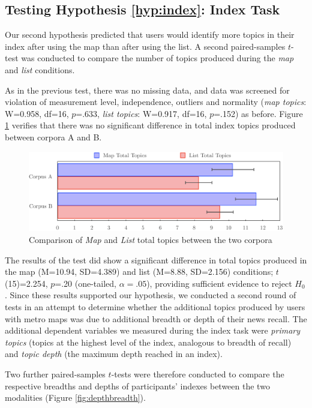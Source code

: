\subsection{Testing Hypothesis \ref{hyp:index}: Index Task}

Our second hypothesis predicted that users would identify more topics in their index after using the map than after using the list. A second paired-samples $t$-test was conducted to compare the number of topics produced during the \textit{map} and \textit{list} conditions.

As in the previous test, there was no missing data, and data was screened for violation of measurement level, independence, outliers and normality (\textit{map topics}: W=0.958, df=16, $p$=.633,  \textit{list topics}: W=0.917, df=16, $p$=.152) as before. Figure \ref{fig:index} verifies that there was no significant difference in total index topics produced between corpora A and B.

\begin{figure}[htbp!]
	\centering
	\includegraphics[width=.9\textwidth]{img/evaluation/index.pdf}
	\caption{Comparison of \textit{Map} and \textit{List} total topics between the two corpora}
	\label{fig:index}
\end{figure}

The results of the test did show a significant difference in total topics produced in the map (M=10.94, SD=4.389) and list (M=8.88, SD=2.156) conditions; $t$(15)=2.254, $p$=.20 (one-tailed, $\alpha=.05$), providing sufficient evidence to reject $H_0$. Since these results supported our hypothesis, we conducted a second round of tests in an attempt to determine whether the additional topics produced by users with metro maps was due to additional breadth or depth of their news recall. The additional dependent variables we measured during the index task were \textit{primary topics} (topics at the highest level of the index, analogous to breadth of recall) and \textit{topic depth} (the maximum depth reached in an index). 

Two further paired-samples $t$-tests were therefore conducted to compare the respective breadths and depths of participants' indexes between the two modalities (Figure \ref{fig:depthbreadth}).

